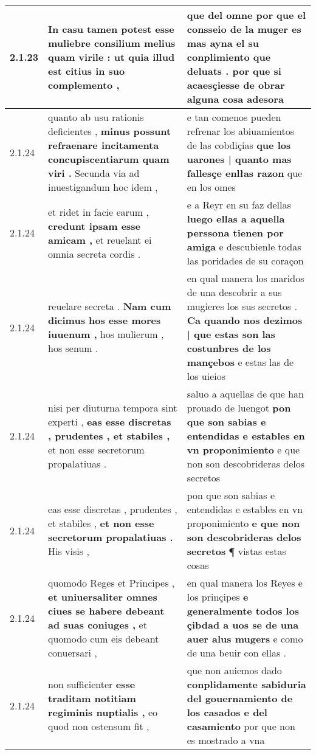 \begin{tabular}{|p{1cm}|p{6.5cm}|p{6.5cm}|}
2.1.23 & In casu tamen potest \textbf{ esse muliebre consilium melius quam virile : } ut quia illud est citius in suo complemento , & que del omne \textbf{ por que el consseio de la muger es mas ayna el su conplimiento que deluats . } por que si acaesçiesse de obrar alguna cosa adesora \\\hline
2.1.24 & quanto ab usu rationis deficientes , \textbf{ minus possunt refraenare incitamenta concupiscentiarum quam viri . } Secunda via ad inuestigandum hoc idem , & e tan comenos pueden refrenar los abiuamientos de las cobdiçias \textbf{ que los uarones | quanto mas fallesçe enlłas razon } que en los omes \\\hline
2.1.24 & et ridet in facie earum , \textbf{ credunt ipsam esse amicam , } et reuelant ei omnia secreta cordis . & e a Reyr en su faz dellas \textbf{ luego ellas a aquella perssona tienen por amiga } e descubienle todas las poridades de su coraçon \\\hline
2.1.24 & reuelare secreta . \textbf{ Nam cum dicimus hos esse mores iuuenum , } hos mulierum , hos senum . & en qual manera los maridos de una descobrir a sus mugieres los sus secretos . \textbf{ Ca quando nos dezimos | que estas son las costunbres de los mançebos } e estas las de los uieios \\\hline
2.1.24 & nisi per diuturna tempora sint experti , \textbf{ eas esse discretas , prudentes , et stabiles , } et non esse secretorum propalatiuas . & saluo a aquellas de que han prouado de luengot \textbf{ pon que son sabias e entendidas e estables en vn proponimiento } e que non son descobrideras delos secretos \\\hline
2.1.24 & eas esse discretas , prudentes , et stabiles , \textbf{ et non esse secretorum propalatiuas . } His visis , & pon que son sabias e entendidas e estables en vn proponimiento \textbf{ e que non son descobrideras delos secretos } ¶ vistas estas cosas \\\hline
2.1.24 & quomodo Reges et Principes , \textbf{ et uniuersaliter omnes ciues se habere debeant ad suas coniuges , } et quomodo cum eis debeant conuersari , & en qual manera los Reyes e los prinçipes \textbf{ e generalmente todos los çibdad a uos se de una auer alus mugers } e como de una beuir con ellas . \\\hline
2.1.24 & non sufficienter \textbf{ esse traditam notitiam regiminis nuptialis , } eo quod non ostensum fit , & que non auiemos dado \textbf{ conplidamente sabiduria del gouernamiento de los casados e del casamiento } por que non es mostrado a vna \\\hline

\end{tabular}
